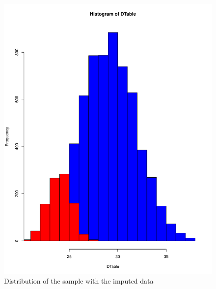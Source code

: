 \documentclass[10pt,a4paper]{article}
\begin{document}
\begin{enumerate}
\begin{figure}
\includegraphics[scale=0.3]{Hist4.pdf}
\caption{Distribution of the sample with the imputed data}
\label{fig-5}
\end{figure}
\begin{figure}

\end{figure}
\end{enumerate}
\end{document}
